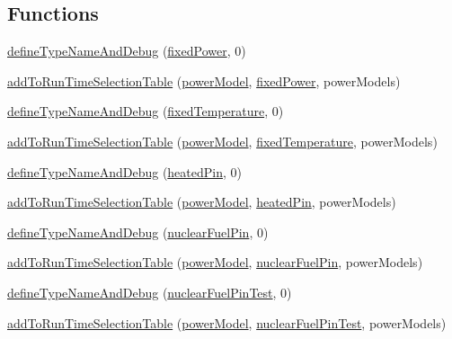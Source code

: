 \subsection*{Functions}
\begin{DoxyCompactItemize}
\item 
\hyperlink{namespaceFoam_1_1powerModels_ae9fb428c437de2a40b135fe0795a5ea8}{define\+Type\+Name\+And\+Debug} (\hyperlink{classFoam_1_1powerModels_1_1fixedPower}{fixed\+Power}, 0)
\item 
\hyperlink{namespaceFoam_1_1powerModels_adf625c5c0aac99773a4d45911eb10469}{add\+To\+Run\+Time\+Selection\+Table} (\hyperlink{classFoam_1_1powerModel}{power\+Model}, \hyperlink{classFoam_1_1powerModels_1_1fixedPower}{fixed\+Power}, power\+Models)
\item 
\hyperlink{namespaceFoam_1_1powerModels_aabef6d5aa4ef2621893a406e161139ce}{define\+Type\+Name\+And\+Debug} (\hyperlink{classFoam_1_1powerModels_1_1fixedTemperature}{fixed\+Temperature}, 0)
\item 
\hyperlink{namespaceFoam_1_1powerModels_afb1b9617144564c5bdaeb69e1ecf3241}{add\+To\+Run\+Time\+Selection\+Table} (\hyperlink{classFoam_1_1powerModel}{power\+Model}, \hyperlink{classFoam_1_1powerModels_1_1fixedTemperature}{fixed\+Temperature}, power\+Models)
\item 
\hyperlink{namespaceFoam_1_1powerModels_a0df752123694940c1368e9188aeb1de3}{define\+Type\+Name\+And\+Debug} (\hyperlink{classFoam_1_1powerModels_1_1heatedPin}{heated\+Pin}, 0)
\item 
\hyperlink{namespaceFoam_1_1powerModels_a44578ffaf1407ce6f5144541c5ab0f9f}{add\+To\+Run\+Time\+Selection\+Table} (\hyperlink{classFoam_1_1powerModel}{power\+Model}, \hyperlink{classFoam_1_1powerModels_1_1heatedPin}{heated\+Pin}, power\+Models)
\item 
\hyperlink{namespaceFoam_1_1powerModels_ac9e561a2a6665dc8cffe73772ae18819}{define\+Type\+Name\+And\+Debug} (\hyperlink{classFoam_1_1powerModels_1_1nuclearFuelPin}{nuclear\+Fuel\+Pin}, 0)
\item 
\hyperlink{namespaceFoam_1_1powerModels_af21d10fadf0788ab3bcbc738f2676c67}{add\+To\+Run\+Time\+Selection\+Table} (\hyperlink{classFoam_1_1powerModel}{power\+Model}, \hyperlink{classFoam_1_1powerModels_1_1nuclearFuelPin}{nuclear\+Fuel\+Pin}, power\+Models)
\item 
\hyperlink{namespaceFoam_1_1powerModels_ac1ee6cb0c6a9f89f8bd3cc744851b150}{define\+Type\+Name\+And\+Debug} (\hyperlink{classFoam_1_1powerModels_1_1nuclearFuelPinTest}{nuclear\+Fuel\+Pin\+Test}, 0)
\item 
\hyperlink{namespaceFoam_1_1powerModels_a9fe465253b2034cf920ff75dea352b70}{add\+To\+Run\+Time\+Selection\+Table} (\hyperlink{classFoam_1_1powerModel}{power\+Model}, \hyperlink{classFoam_1_1powerModels_1_1nuclearFuelPinTest}{nuclear\+Fuel\+Pin\+Test}, power\+Models)
\end{DoxyCompactItemize}


